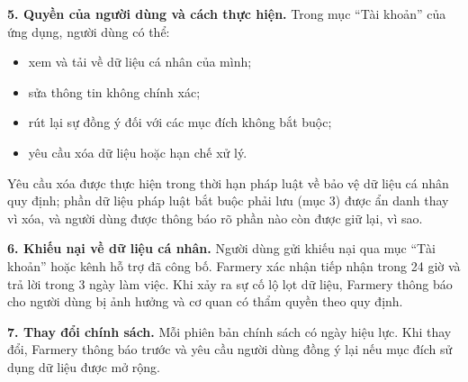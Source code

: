 \noindent\textbf{5. Quyền của người dùng và cách thực hiện.} Trong mục ``Tài
khoản'' của ứng dụng, người dùng có thể:
\begin{itemize}
    \item xem và tải về dữ liệu cá nhân của mình;
    \item sửa thông tin không chính xác;
    \item rút lại sự đồng ý đối với các mục đích không bắt buộc;
    \item yêu cầu xóa dữ liệu hoặc hạn chế xử lý.
\end{itemize}
Yêu cầu xóa được thực hiện trong thời hạn pháp luật về bảo vệ dữ liệu cá nhân quy định; phần dữ liệu pháp luật bắt buộc phải
lưu (mục 3) được ẩn danh thay vì xóa, và người dùng được thông báo rõ phần nào
còn được giữ lại, vì sao.

\noindent\textbf{6. Khiếu nại về dữ liệu cá nhân.} Người dùng gửi khiếu nại
qua mục ``Tài khoản'' hoặc kênh hỗ trợ đã công bố. Farmery xác nhận tiếp nhận
trong 24 giờ và trả lời trong 3 ngày làm việc. Khi xảy ra sự cố lộ lọt dữ
liệu, Farmery thông báo cho người dùng bị ảnh hưởng và cơ quan có thẩm quyền
theo quy định.

\noindent\textbf{7. Thay đổi chính sách.} Mỗi phiên bản chính sách có ngày
hiệu lực. Khi thay đổi, Farmery thông báo trước và yêu cầu người dùng đồng ý
lại nếu mục đích sử dụng dữ liệu được mở rộng.
